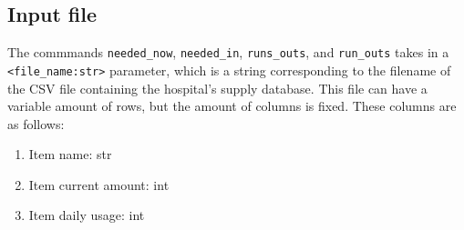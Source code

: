 \documentclass{article}
\begin{document}
		\subsection{Input file}
			The commmands \verb|needed_now|, \verb|needed_in|, \verb|runs_outs|, and
			\verb|run_outs| takes in a \verb|<file_name:str>| parameter, which is a
			string corresponding to the filename of the CSV file containing the hospital's
			supply database. This file can have a variable amount of rows, but the amount of
			columns is fixed. These columns are as follows:

			\begin{enumerate}
				\item Item name: str
				\item Item current amount: int
				\item Item daily usage: int
			\end{enumerate}
\end{document}

